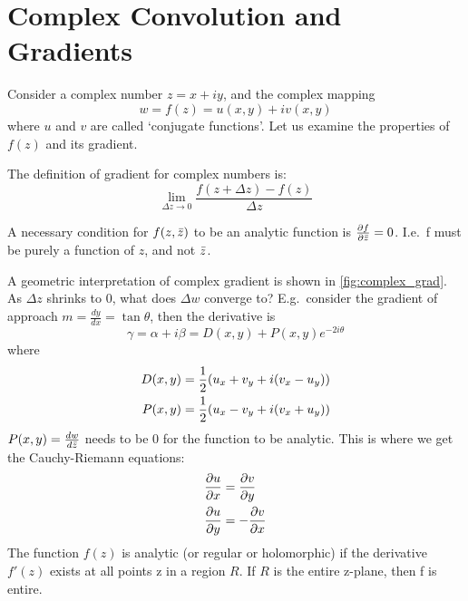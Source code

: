 \chapter{Complex Convolution and Gradients}\label{app:ch6:complex_backprop}
Consider a complex number $z=x+iy$, and the complex mapping 
\begin{equation}
w=f(z) = u(x,y) + iv(x,y)
\end{equation}
where $u$ and $v$ are called `conjugate functions'. Let us examine the
properties of $f(z)$ and its gradient. 

The definition of gradient for complex numbers is:
\begin{equation} 
  \lim_{\Delta z\to 0} \frac{f(z + \Delta z) - f(z)}{\Delta z}
\end{equation}

A necessary condition for $f(z,\bar{z})$ to be an analytic function is
$\frac{\partial f}{\partial \bar{z}}=0$. I.e.\ f must be purely a function of $z$, and not
$\bar{z}$.

A geometric interpretation of complex gradient is shown in
\autoref{fig:complex_grad}.  As $\Delta z$ shrinks to 0, what does $\Delta w$
converge to? E.g.\ consider the gradient of approach $m=\frac{dy}{dx}=\tan
\theta$, then the derivative is
\begin{equation}
  \gamma = \alpha + i\beta = D(x,y) + P(x,y)e^{-2i\theta}
\end{equation}
where
\begin{align}
  D(x,y) & =  \frac{1}{2}(u_x + v_y + i(v_x - u_y)) \\
  P(x,y) & =  \frac{1}{2}(u_x - v_y + i(v_x + u_y))
\end{align}
$P(x,y)=\frac{dw}{d\bar{z}}$ needs to be 0 for the function to be analytic.
This is where we get the Cauchy-Riemann equations:
\begin{align}
  \frac{\partial u}{\partial x}&= \frac{\partial v}{\partial y} \\
  \frac{\partial u}{\partial y}&= -\frac{\partial v}{\partial x}
\end{align}
The function $f(z)$ is analytic (or regular or holomorphic) if the derivative 
$f'(z)$ exists at all points z in a region $R$. If $R$ is the entire z-plane,
then f is entire. 

\begin{figure}[!h]
	\centering
  
  \label{fig:complex_grad}
\end{figure}

